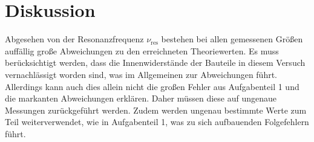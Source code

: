 \section{Diskussion}
Abgesehen von der Resonanzfrequenz $\nu_{\text{res}}$ bestehen bei allen gemessenen Größen auffällig große Abweichungen zu den erreichneten Theoriewerten. 
Es muss berücksichtigt werden, dass die Innenwiderstände der Bauteile in diesem Versuch vernachlässigt worden sind, was im Allgemeinen zur Abweichungen führt. Allerdings kann auch dies allein nicht die 
großen Fehler aus Aufgabenteil 1 und die markanten Abweichungen erklären. Daher müssen diese auf ungenaue Messungen zurückgeführt werden. Zudem werden ungenau bestimmte Werte zum Teil weiterverwendet,
wie in Aufgabenteil 1, was zu sich aufbauenden Folgefehlern führt.
